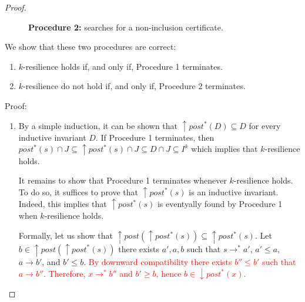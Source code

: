 \begin{proof}
\begin{figure}
	\caption{\textbf{Procedure 2:} searches for a non-inclusion certificate.}\label{procedure2}
\end{figure}

\newpage


We show that these two procedures are correct:


\begin{enumerate}

\item $k$-resilience holds if, and only if, Procedure 1 terminates.

\item $k$-resilience do not hold if, and only if, Procedure 2 terminates.

\end{enumerate}

Proof:

\begin{enumerate}

\item By a simple induction, it can be shown that $\uparrow post^*(D) \subseteq D$ for every inductive invariant $D$. 
If Procedure 1 terminates, then
$post^*(s) \cap J \subseteq \uparrow post^*(s) \cap J \subseteq D  \cap J \subseteq I^k$
which implies that $k$-resilience holds.

It remains to show that Procedure 1 terminates whenever $k$-resilience holds. To do so, it suffices to prove that $\uparrow post^*(s)$ is an inductive invariant. Indeed, this implies that
$\uparrow post^*(s)$ is eventyally found by Procedure 1 when $k$-resilience holds. 

Formally, let us show that $\uparrow post(\uparrow post^*(s)) \subseteq \uparrow post^*(s)$.
Let $b \in \uparrow post(\uparrow post^*(s))$ 
there exists $a', a, b$ such that
$s \rightarrow^* a'$,
$a' \leq a$,
$a \rightarrow b'$,
and
$b' \leq b$.
\textcolor{red}{By downward compatibility 
there exists $b'' \leq b'$ such that $a \rightarrow b'' $. Therefore, $x \rightarrow^* b''$ and $b' \geq b$, hence $b \in \downarrow post^*(x)$.}


\end{enumerate}
\end{proof}

